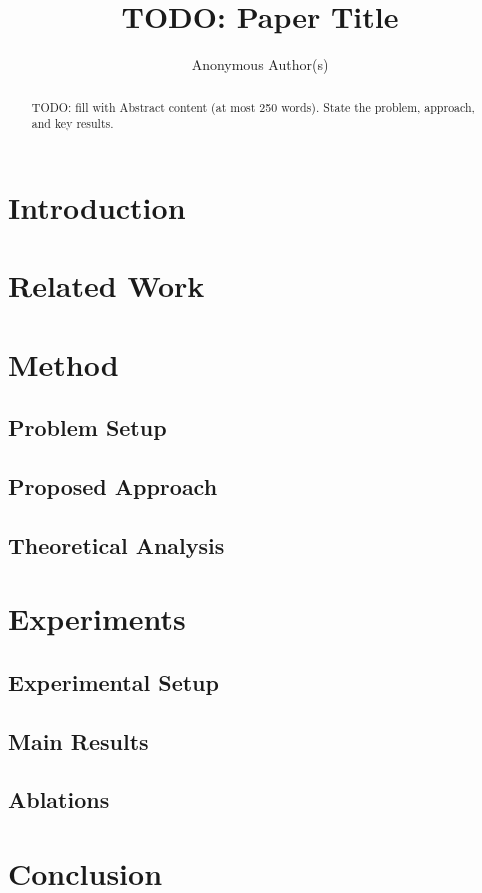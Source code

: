\documentclass{article}
\title{TODO: Paper Title}
\author{Anonymous Author(s)}
\begin{document}
\maketitle

\begin{abstract}
TODO: fill with Abstract content (at most 250 words). State the problem, approach, and key results.
\end{abstract}

\section{Introduction}

\section{Related Work}

\section{Method}

\subsection{Problem Setup}

\subsection{Proposed Approach}

\subsection{Theoretical Analysis}

\section{Experiments}

\subsection{Experimental Setup}

\subsection{Main Results}

\subsection{Ablations}

\section{Conclusion}



\end{document}
